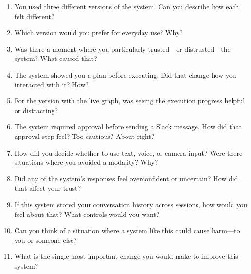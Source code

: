 \documentclass[sigconf, anonymous]{acmart}
\begin{document}
\begin{enumerate}
  \item You used three different versions of the system. Can you describe how each felt different?
  \item Which version would you prefer for everyday use? Why?
  \item Was there a moment where you particularly trusted---or distrusted---the system? What caused that?
  \item The system showed you a plan before executing. Did that change how you interacted with it? How?
  \item For the version with the live graph, was seeing the execution progress helpful or distracting?
  \item The system required approval before sending a Slack message. How did that approval step feel? Too cautious? About right?
  \item How did you decide whether to use text, voice, or camera input? Were there situations where you avoided a modality? Why?
  \item Did any of the system's responses feel overconfident or uncertain? How did that affect your trust?
  \item If this system stored your conversation history across sessions, how would you feel about that? What controls would you want?
  \item Can you think of a situation where a system like this could cause harm---to you or someone else?
  \item What is the single most important change you would make to improve this system?
\end{enumerate}
\end{document}
